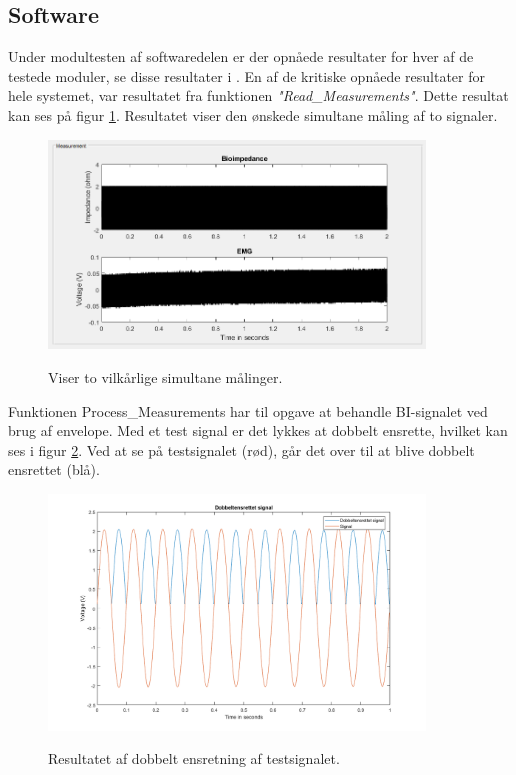 \subsection{Software}

Under modultesten af softwaredelen er der opnåede resultater for hver af de testede moduler, se disse resultater i . En af de kritiske opnåede resultater for hele systemet, var resultatet fra funktionen \textit{"Read\_Measurements"}. Dette resultat kan ses på figur \ref{fig:modultestshow}. Resultatet viser den ønskede simultane måling af to signaler. 

\begin{figure}[H] 
\centering
{\includegraphics[width=10cm]
{Figure/modultestshow}}
\caption{Viser to vilkårlige simultane målinger.}
\label{fig:modultestshow}
\end{figure}


Funktionen Process\_Measurements har til opgave at behandle BI-signalet ved brug af envelope. Med et test signal er det lykkes at dobbelt ensrette, hvilket kan ses i figur \ref{fig:modultestprocessEnsrettet}. Ved at se på testsignalet (rød), går det over til at blive dobbelt ensrettet (blå). 

\begin{figure}[H] 
\centering
{\includegraphics[width=10cm]
{Figure/modultestprocessEnsrettet}}
\caption{Resultatet af dobbelt ensretning af testsignalet.}
\label{fig:modultestprocessEnsrettet}
\end{figure}

